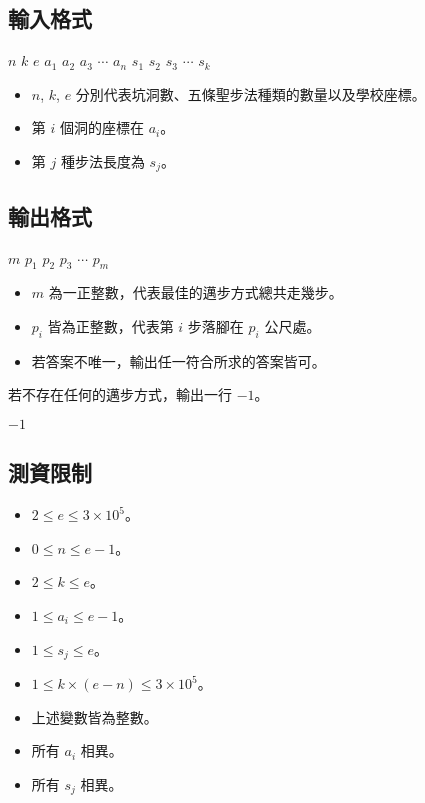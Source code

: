 \subsection{輸入格式}

\begin{format}
\f{
$n$ $k$ $e$
$a_1$ $a_2$ $a_3$ $\cdots$ $a_n$
$s_1$ $s_2$ $s_3$ $\cdots$ $s_k$
}
\end{format}

\begin{itemize}
\tightlist
\item
  \(n\), \(k\), \(e\) 分別代表坑洞數、五條聖步法種類的數量以及學校座標。
\item
  第 \(i\) 個洞的座標在 \(a_i\)。
\item
  第 \(j\) 種步法長度為 \(s_j\)。
\end{itemize}

\subsection{輸出格式}

\begin{format}
\f{
$m$
$p_1$ $p_2$ $p_3$ $\cdots$ $p_m$
}
\end{format}

\begin{itemize}
\tightlist
\item
  \(m\) 為一正整數，代表最佳的邁步方式總共走幾步。
\item
  \(p_i\) 皆為正整數，代表第 \(i\) 步落腳在 \(p_i\) 公尺處。
\item
  若答案不唯一，輸出任一符合所求的答案皆可。
\end{itemize}

若不存在任何的邁步方式，輸出一行 \(-1\)。

\begin{format}
\f{
$-1$
}
\end{format}

\subsection{測資限制}

\begin{itemize}
\tightlist
\item
  \(2 \le e \le 3 \times 10^5\)。
\item
  \(0 \le n \le e - 1\)。
\item
  \(2 \le k \le e\)。
\item
  \(1 \le a_i \le e - 1\)。
\item
  \(1 \le s_j \le e\)。
\item
  \(1 \le k\times (e - n) \le 3 \times 10^5\)。
\item
  上述變數皆為整數。
\item
  所有 \(a_i\) 相異。
\item
  所有 \(s_j\) 相異。
\end{itemize}


